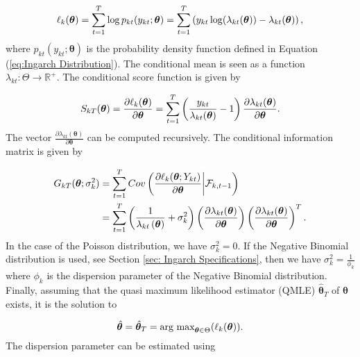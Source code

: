 \begin{equation}
\ell_k(\bm{\theta}) = \sum_{t=1}^T\log p_{kt}(y_{kt};\bm{\theta}) = \sum_{t=1}^T \left(y_{kt}\log(\lambda_{kt}(\bm{\theta})) - \lambda_{kt}(\bm{\theta})\right),
\label{eq: Quasi log likelihood}
\end{equation}
%
where $p_{kt}(y_{kt};\bm{\theta})$ is the probability density function defined in Equation (\ref{eq:Ingarch Distribution}). The conditional mean is seen as a function $\lambda_{kt}: \Theta \rightarrow \mathbb{R}^{+}$. The conditional score function is given by

\begin{equation}
S_{kT}(\bm{\theta}) = \frac{\partial \ell_k(\bm{\theta})}{\partial \bm{\theta}} = \sum_{t=1}^T\left(\frac{y_{kt}}{\lambda_{kt}(\bm{\theta})}-1\right)\frac{\partial\lambda_{kt}(\bm{\theta})}{\partial \bm{\theta}}.
\label{eq:conditional score}
\end{equation}
%
The vector $\frac{\partial\lambda_{kt}(\bm{\theta})}{\partial \bm{\theta}}$ can be computed recursively. 
The conditional information matrix is given by

\begin{equation}
\begin{aligned}
G_{kT}(\bm{\theta};\sigma_k^2) &= \sum_{t=1}^T Cov\left(\frac{\partial \ell_k(\bm{\theta}; Y_{kt})}{\partial \bm{\theta}} \middle| \mathcal{F}_{k,t-1}\right) \\
&=  \sum_{t=1}^T \left(\frac{1}{\lambda_{kt}\left(\bm{\theta}\right)}+\sigma_k^2\right) \left(\frac{\partial \lambda_{kt}(\bm{\theta})}{\partial \bm{\theta}}\right)\left(\frac{\partial \lambda_{kt}(\bm{\theta})}{\partial \bm{\theta}}\right)^T.
\label{eq:conditional information matrix}
\end{aligned}
\end{equation}
%
In the case of the Poisson distribution, we have $\sigma_k^2=0$. If the Negative Binomial distribution is used, see Section \ref{sec: Ingarch Specifications}, then we have $\sigma_k^2=\frac{1}{\phi_k}$ where $\phi_k$ is the dispersion parameter of the Negative Binomial distribution.
Finally, assuming that the quasi maximum likelihood estimator (QMLE) $\hat{\bm{\theta}}_T$ of $\bm{\theta}$ exists, it is the solution to 

\begin{equation}
\hat{\bm{\theta}}= \hat{\bm{\theta}}_T = \text{arg max}_{\bm{\theta} \in \Theta} (\ell_k(\bm{\theta})). 
\label{eq:ingarch qmle}
\end{equation}
%
The dispersion parameter can be estimated using

